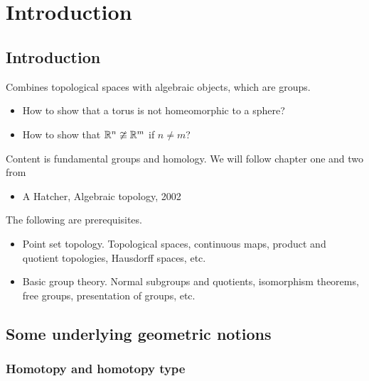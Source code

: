 \def\module{M3P21 Geometry II: Algebraic Topology}
\def\lecturer{Dr Christian Urech}
\def\term{Spring 2019}

\def\thm{section}







\section{Introduction}


\subsection{Introduction}

Combines topological spaces with algebraic objects, which are groups.
\begin{itemize}
\item How to show that a torus is not homeomorphic to a sphere?
\item How to show that $ \mathbb{R}^n \ncong \mathbb{R}^m $ if $ n \ne m $?
\end{itemize}

Content is fundamental groups and homology. We will follow chapter one and two from
\begin{itemize}
\item A Hatcher, Algebraic topology, 2002
\end{itemize}

The following are prerequisites.
\begin{itemize}
\item Point set topology. Topological spaces, continuous maps, product and quotient topologies, Hausdorff spaces, etc.
\item Basic group theory. Normal subgroups and quotients, isomorphism theorems, free groups, presentation of groups, etc.
\end{itemize}

\subsection{Some underlying geometric notions}

\subsubsection{Homotopy and homotopy type}

